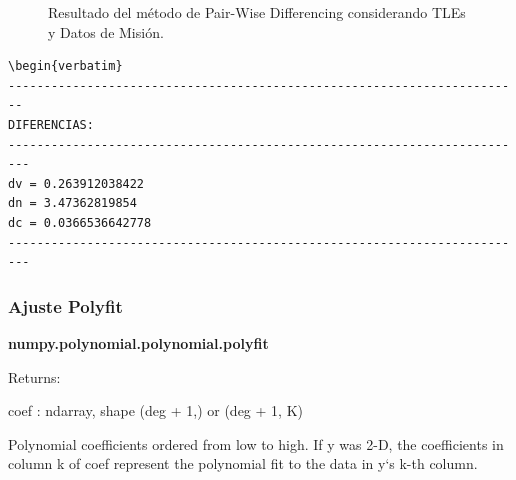 \begin{figure}[htbp]
 \centering
 \caption{Resultado del m\'etodo de Pair-Wise Differencing considerando TLEs y Datos de Misi\'on.}
 \label{fig:test}
\end{figure}

\begin{verbatim}
\begin{verbatim}
------------------------------------------------------------------------
DIFERENCIAS:
-------------------------------------------------------------------------
dv = 0.263912038422
dn = 3.47362819854
dc = 0.0366536642778
-------------------------------------------------------------------------
\end{verbatim}

\subsubsection*{Ajuste Polyfit}

{\bf{numpy.polynomial.polynomial.polyfit}}

Returns:	

coef : ndarray, shape (deg + 1,) or (deg + 1, K)

    Polynomial coefficients ordered from low to high. If y was 2-D, the coefficients in column k of coef represent the polynomial fit to the data in y‘s k-th column.


